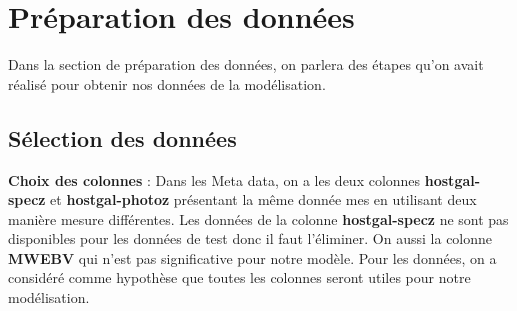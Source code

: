 \section{Préparation des données}
Dans la section de préparation des données, on parlera des étapes qu’on avait réalisé pour obtenir nos données de la modélisation.
\subsection{Sélection des données}
\textbf{Choix des colonnes} : Dans les Meta data, on a les deux colonnes \textbf{hostgal-specz} et\textbf{ hostgal-photoz} présentant la même donnée mes en utilisant deux manière mesure différentes. Les données de la colonne \textbf{hostgal-specz} ne sont pas disponibles pour les données de test donc il faut l’éliminer. On aussi la colonne \textbf{MWEBV} qui n’est pas significative pour notre modèle. Pour les données, on a considéré comme hypothèse que toutes les colonnes seront utiles pour notre modélisation.
